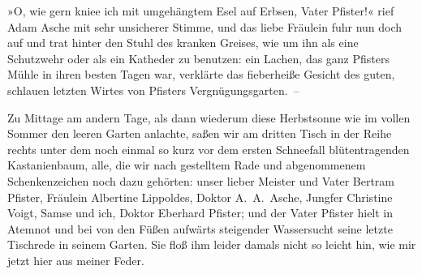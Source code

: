 »O, wie gern kniee ich mit umgehängtem Esel auf Erbsen, Vater
Pfister!« rief Adam Asche mit sehr unsicherer Stimme, und das liebe
Fräulein fuhr nun doch auf und trat hinter den Stuhl des kranken
Greises, wie um ihn als eine Schutzwehr oder als ein Katheder zu
benutzen: ein Lachen, das ganz Pfisters Mühle in ihren besten Tagen
war, verklärte das fieberheiße Gesicht des guten, schlauen letzten
Wirtes von Pfisters Vergnügungsgarten.~–

Zu Mittage am andern Tage, als dann wiederum diese Herbstsonne wie
im vollen Sommer den leeren Garten anlachte, saßen wir am dritten
Tisch in der Reihe rechts unter dem noch einmal so kurz vor dem
ersten Schneefall blütentragenden Kastanienbaum, alle, die wir nach
gestelltem Rade und abgenommenem Schenkenzeichen noch dazu
gehörten: unser lieber Meister und Vater Bertram Pfister, Fräulein
Albertine Lippoldes, Doktor A.~A.~Asche, Jungfer Christine Voigt,
Samse und ich, Doktor Eberhard Pfister; und der Vater Pfister hielt
in Atemnot und bei von den Füßen aufwärts steigender Wassersucht
seine letzte Tischrede in seinem Garten. Sie floß ihm leider damals
nicht so leicht hin, wie mir jetzt hier aus meiner Feder.

